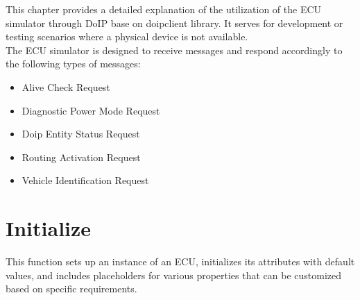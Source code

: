 




This chapter provides a detailed explanation of the utilization of the ECU simulator through DoIP base on doipclient library. It serves for development or testing scenarios where a physical device is not available.
\\The ECU simulator is designed to receive messages and respond accordingly to the following types of messages:

\begin{itemize}
   \item Alive Check Request
   \item Diagnostic Power Mode Request
   \item Doip Entity Status Request
   \item Routing Activation Request
   \item Vehicle Identification Request
\end{itemize}

\section{Initialize}

This function sets up an instance of an ECU, initializes its attributes with default values, and includes placeholders for various properties that can be customized based on specific requirements.

